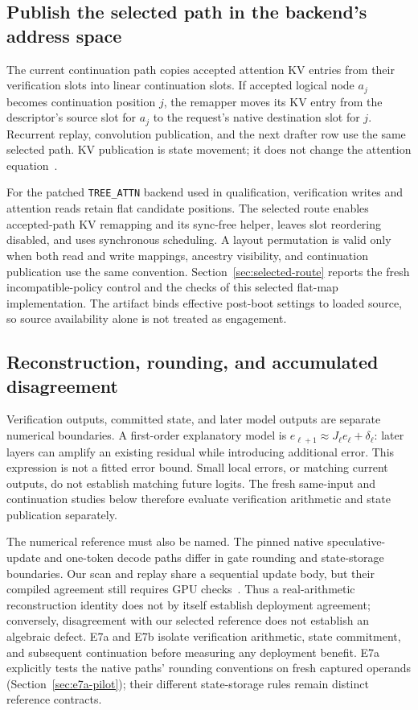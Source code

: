\documentclass[conference]{IEEEtran}
\begin{document}
\subsection{Publish the selected path in the backend's address space}
The current continuation path copies accepted attention KV entries from their verification slots into linear continuation slots. If accepted logical node $a_j$ becomes continuation position $j$, the remapper moves its KV entry from the descriptor's source slot for $a_j$ to the request's native destination slot for $j$. Recurrent replay, convolution publication, and the next drafter row use the same selected path. KV publication is state movement; it does not change the attention equation~\cite{lumo2026archive}.

For the patched \texttt{TREE\_ATTN} backend used in qualification, verification writes and attention reads retain flat candidate positions. The selected route enables accepted-path KV remapping and its sync-free helper, leaves slot reordering disabled, and uses synchronous scheduling. A layout permutation is valid only when both read and write mappings, ancestry visibility, and continuation publication use the same convention. Section~\ref{sec:selected-route} reports the fresh incompatible-policy control and the checks of this selected flat-map implementation. The artifact binds effective post-boot settings to loaded source, so source availability alone is not treated as engagement.

\subsection{Reconstruction, rounding, and accumulated disagreement}
\label{sec:reconstruction-numerics}
Verification outputs, committed state, and later model outputs are separate numerical boundaries. A first-order explanatory model is $e_{\ell+1}\approx J_\ell e_\ell+\delta_\ell$: later layers can amplify an existing residual while introducing additional error. This expression is not a fitted error bound. Small local errors, or matching current outputs, do not establish matching future logits. The fresh same-input and continuation studies below therefore evaluate verification arithmetic and state publication separately.

The numerical reference must also be named. The pinned native speculative-update and one-token decode paths differ in gate rounding and state-storage boundaries. Our scan and replay share a sequential update body, but their compiled agreement still requires GPU checks~\cite{lumo2026archive}. Thus a real-arithmetic reconstruction identity does not by itself establish deployment agreement; conversely, disagreement with our selected reference does not establish an algebraic defect. E7a and E7b isolate verification arithmetic, state commitment, and subsequent continuation before measuring any deployment benefit. E7a explicitly tests the native paths' rounding conventions on fresh captured operands (Section~\ref{sec:e7a-pilot}); their different state-storage rules remain distinct reference contracts.
\end{document}
